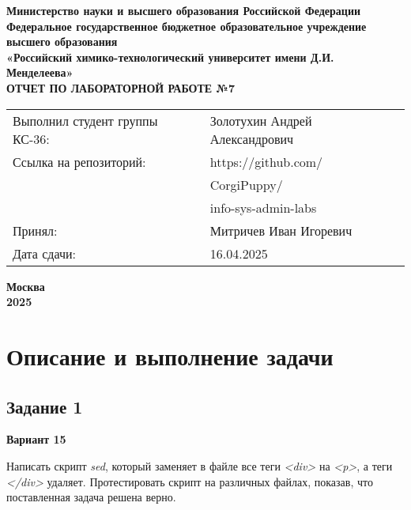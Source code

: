 \documentclass[12pt, a4paper]{report}
\begin{document}
	\begin{titlepage}
		\begin{center}
			\large \textbf{Министерство науки и высшего образования Российской Федерации} \\
			\large \textbf{Федеральное государственное бюджетное образовательное учреждение высшего образования} \\
			\large \textbf{«Российский химико-технологический университет имени Д.И. Менделеева»} \\

			\vspace*{4cm}
			\LARGE \textbf{ОТЧЕТ ПО ЛАБОРАТОРНОЙ РАБОТЕ №7}

			\vspace*{4cm}
			\begin{flushright}
				\Large
				\begin{tabular}{>{\raggedleft\arraybackslash}p{8.85cm} p{10.8cm}}
					Выполнил студент группы КС-36: & Золотухин Андрей Александрович \\
					Ссылка на репозиторий: & https://github.com/ \\ 
					& CorgiPuppy/ \\
					& info-sys-admin-labs \\
					Принял: & Митричев Иван Игоревич \\
					Дата сдачи: & 16.04.2025 \\
				\end{tabular}

			\end{flushright}

			\vspace*{6cm}
			\Large \textbf{Москва \\ 2025}
		\end{center}
	\end{titlepage}
	
	\tableofcontents	
	\thispagestyle{empty}
	\newpage

	
	\section*{Описание и выполнение задачи}
	\large

	\subsection*{Задание 1}
	\large
	\begin{center}
		\textbf{Вариант 15}
	\end{center}
	\par
	Написать скрипт \textit{sed}, который заменяет в файле все теги \textit{<div>} на \textit{<p>}, а теги \textit{</div>} удаляет. Протестировать скрипт на различных файлах, показав, что поставленная задача решена верно.
	\lstset{style=mystyle}
	
	
\end{document}
